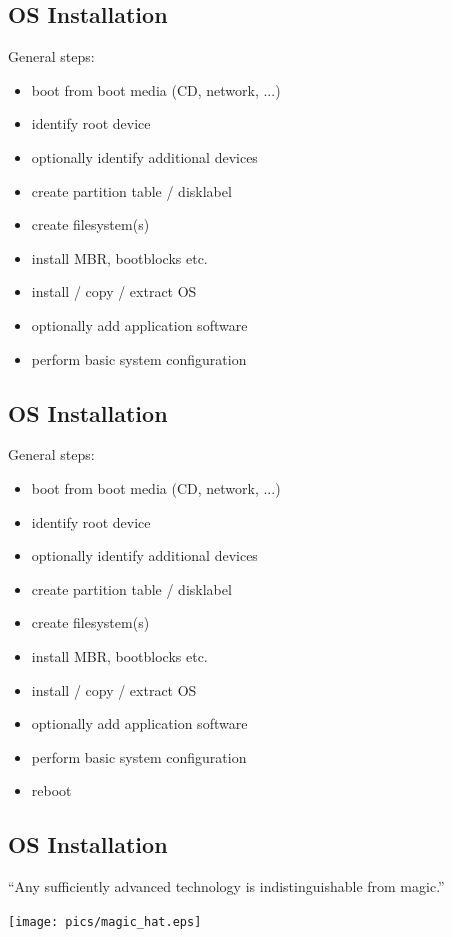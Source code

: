 \documentclass[xga]{xdvislides}
\begin{document}
\subsection{OS Installation}
General steps:
\begin{itemize}
	\item boot from boot media (CD, network, ...)
	\item identify root device
	\item optionally identify additional devices
	\item create partition table / disklabel
	\item create filesystem(s)
	\item install MBR, bootblocks etc.
	\item install / copy / extract OS
	\item optionally add application software
	\item perform basic system configuration
\end{itemize}

\subsection{OS Installation}
General steps:
\begin{itemize}
	\item boot from boot media (CD, network, ...)
	\item identify root device
	\item optionally identify additional devices
	\item create partition table / disklabel
	\item create filesystem(s)
	\item install MBR, bootblocks etc.
	\item install / copy / extract OS
	\item optionally add application software
	\item perform basic system configuration
	\item reboot
\end{itemize}


\subsection{OS Installation}
``Any sufficiently advanced technology is indistinguishable from magic.''
\vspace*{\fill}
\begin{center}
	\texttt{[image: pics/magic\_hat.eps]}
\end{center}
\vspace*{\fill}
\end{document}
